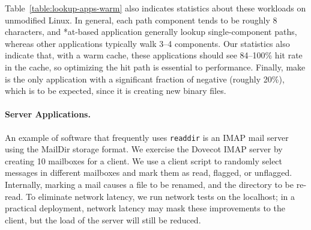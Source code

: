 Table~\ref{table:lookup-apps-warm} also indicates statistics about these workloads
on unmodified Linux.  
In general, each path component tends to be roughly 8 characters, 
and *at-based application generally lookup single-component paths, 
whereas other applications typically walk 3--4 components.  
Our statistics also indicate that, with a warm cache, these applications 
should see 84--100\% hit rate in the cache, so optimizing the hit path is essential to performance.
Finally, make is the only application with a significant fraction of 
negative \dentries{} (roughly 20\%),
which is to be expected, since it is creating new binary files.


\paragraph{Server Applications.}
An example of software that frequently uses {\tt readdir} is an
IMAP mail server using the MailDir storage format.
We exercise the Dovecot IMAP server by creating 10 mailboxes for a client.
We use a client script to randomly select messages in different mailboxes and mark them as read, flagged, or unflagged.
Internally, marking a mail causes a file to be renamed, and the directory to be re-read.
To eliminate network latency, we run network tests on the localhost; 
in a practical deployment, network latency may mask these improvements to the client, but the load of the server will still be reduced.



